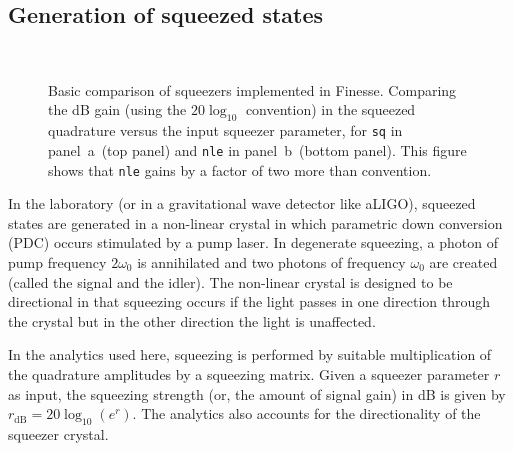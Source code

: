\documentclass[aps,pra,superscriptaddress,reprint,nofootinbib]{revtex4-1}
\newcommand{\code}[1]{\texttt{#1}}
\begin{document}
\subsection{Generation of squeezed states}

\begin{figure}[ht]%
    \centering
    \\
    \caption{Basic comparison of squeezers implemented in Finesse. Comparing the dB gain (using the $20 \log_{10}$ convention) in the squeezed quadrature versus the input squeezer parameter, for \code{sq} in panel~a~(top panel) and \code{nle} in panel~b~(bottom panel). This figure shows that \code{nle} gains by a factor of two more than convention.}%
    \label{fig:testing_Finesse_squeezers}%
\end{figure}

In the laboratory (or in a gravitational wave detector like aLIGO), squeezed states are generated in a non-linear crystal in which parametric down conversion (PDC) occurs stimulated by a pump laser. In degenerate squeezing, a photon of pump frequency $2\omega_0$ is annihilated and two photons of frequency $\omega_0$ are created (called the signal and the idler). The non-linear crystal is designed to be directional in that squeezing occurs if the light passes in one direction through the crystal but in the other direction the light is unaffected.


In the analytics used here, squeezing is performed by suitable multiplication of the quadrature amplitudes by a squeezing matrix. Given a squeezer parameter $r$ as input, the squeezing strength (or, the amount of signal gain) in dB is given by $r_{\mathrm{dB}} = 20 \log_{10}(e^r)$. The analytics also accounts for the directionality of the squeezer crystal.
\end{document}
